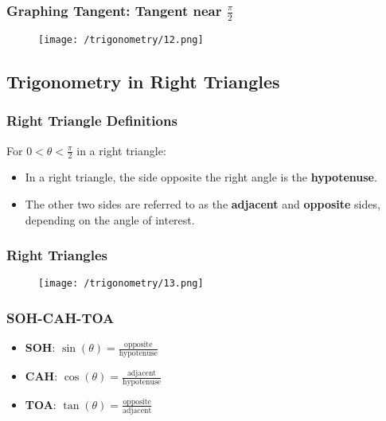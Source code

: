 \documentclass{beamer}
\begin{document}
\begin{frame}
    \frametitle{Graphing Tangent: Tangent near \(\frac{\pi}{2}\)}
    \begin{figure}
        \centering
        \texttt{[image: /trigonometry/12.png]}
    \end{figure}
\end{frame}

\subsection{Trigonometry in Right Triangles}
\begin{frame}
    \frametitle{Right Triangle Definitions}
    For \(0<\theta<\frac{\pi}{2}\) in a right triangle:
    \begin{itemize}
        \item In a right triangle, the side opposite the right angle is the \textbf{hypotenuse}.
        \item The other two sides are referred to as the \textbf{adjacent} and \textbf{opposite} sides, depending on the angle of interest.
    \end{itemize}
\end{frame}
\begin{frame}
    \frametitle{Right Triangles}
    \begin{figure}
        \centering
        \texttt{[image: /trigonometry/13.png]}
    \end{figure}
\end{frame}

\begin{frame}
    \frametitle{SOH-CAH-TOA}
    \begin{itemize}
        \item \textbf{SOH}: \(\sin(\theta) = \frac{\text{opposite}}{\text{hypotenuse}}\)
        \item \textbf{CAH}: \(\cos(\theta) = \frac{\text{adjacent}}{\text{hypotenuse}}\)
        \item \textbf{TOA}: \(\tan(\theta) = \frac{\text{opposite}}{\text{adjacent}}\)
    \end{itemize}
\end{frame}
\end{document}
